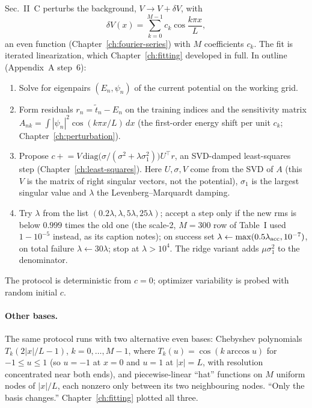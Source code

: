 Sec.~II~C perturbs the background, $V\to V+\delta V$, with
\begin{equation}
\delta V(x)=\sum_{k=0}^{M-1}c_k\cos\frac{k\pi x}{L},
\label{eq:paper-setup-dv}
\end{equation}
an even function (Chapter~\ref{ch:fourier-series}) with $M$ coefficients $c_k$. The fit is iterated linearization, which Chapter~\ref{ch:fitting} developed in full. In outline (Appendix~A step~6):
\begin{enumerate}
\item Solve for eigenpairs $(E_n,\psi_n)$ of the current potential on the working grid.
\item Form residuals $r_n=\tilde t_n-E_n$ on the training indices and the sensitivity matrix $A_{nk}=\int|\psi_n|^2\cos(k\pi x/L)\,dx$ (the first-order energy shift per unit $c_k$; Chapter~\ref{ch:perturbation}).
\item Propose $c\mathrel{+}=V\,\mathrm{diag}\bigl(\sigma/(\sigma^2+\lambda\sigma_1^2)\bigr)U^\top r$, an SVD-damped least-squares step (Chapter~\ref{ch:least-squares}). Here $U,\sigma,V$ come from the SVD of $A$ (this $V$ is the matrix of right singular vectors, not the potential), $\sigma_1$ is the largest singular value and $\lambda$ the Levenberg--Marquardt damping.
\item Try $\lambda$ from the list $(0.2\lambda,\lambda,5\lambda,25\lambda)$; accept a step only if the new rms is below $0.999$ times the old one (the scale-2, $M=300$ row of Table~I used $1-10^{-5}$ instead, as its caption notes); on success set $\lambda\leftarrow\max(0.5\lambda_{\rm acc},10^{-7})$, on total failure $\lambda\leftarrow30\lambda$; stop at $\lambda>10^4$. The ridge variant adds $\mu\sigma_1^2$ to the denominator.
\end{enumerate}
The protocol is deterministic from $c=0$; optimizer variability is probed with random initial $c$.

\paragraph{Other bases.} The same protocol runs with two alternative even bases: Chebyshev polynomials $T_k(2|x|/L-1)$, $k=0,\dots,M-1$, where $T_k(u)=\cos(k\arccos u)$ for $-1\le u\le1$ (so $u=-1$ at $x=0$ and $u=1$ at $|x|=L$, with resolution concentrated near both ends), and piecewise-linear ``hat'' functions on $M$ uniform nodes of $|x|/L$, each nonzero only between its two neighbouring nodes. ``Only the basis changes.'' Chapter~\ref{ch:fitting} plotted all three.

